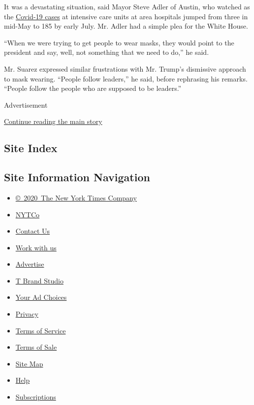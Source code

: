 It was a devastating situation, said Mayor Steve Adler of Austin, who
watched as the
\href{https://dshs.texas.gov/coronavirus/additionaldata.aspx}{Covid-19
cases} at intensive care units at area hospitals jumped from three in
mid-May to 185 by early July. Mr. Adler had a simple plea for the White
House.

``When we were trying to get people to wear masks, they would point to
the president and say, well, not something that we need to do,'' he
said.

Mr. Suarez expressed similar frustrations with Mr. Trump's dismissive
approach to mask wearing. ``People follow leaders,'' he said, before
rephrasing his remarks. ``People follow the people who are supposed to
be leaders.''

Advertisement

\protect\hyperlink{after-bottom}{Continue reading the main story}

\hypertarget{site-index}{%
\subsection{Site Index}\label{site-index}}

\hypertarget{site-information-navigation}{%
\subsection{Site Information
Navigation}\label{site-information-navigation}}

\begin{itemize}
\tightlist
\item
  \href{https://help.nytimes.com/hc/en-us/articles/115014792127-Copyright-notice}{©~2020~The
  New York Times Company}
\end{itemize}

\begin{itemize}
\tightlist
\item
  \href{https://www.nytco.com/}{NYTCo}
\item
  \href{https://help.nytimes.com/hc/en-us/articles/115015385887-Contact-Us}{Contact
  Us}
\item
  \href{https://www.nytco.com/careers/}{Work with us}
\item
  \href{https://nytmediakit.com/}{Advertise}
\item
  \href{http://www.tbrandstudio.com/}{T Brand Studio}
\item
  \href{https://www.nytimes.com/privacy/cookie-policy\#how-do-i-manage-trackers}{Your
  Ad Choices}
\item
  \href{https://www.nytimes.com/privacy}{Privacy}
\item
  \href{https://help.nytimes.com/hc/en-us/articles/115014893428-Terms-of-service}{Terms
  of Service}
\item
  \href{https://help.nytimes.com/hc/en-us/articles/115014893968-Terms-of-sale}{Terms
  of Sale}
\item
  \href{https://spiderbites.nytimes.com}{Site Map}
\item
  \href{https://help.nytimes.com/hc/en-us}{Help}
\item
  \href{https://www.nytimes.com/subscription?campaignId=37WXW}{Subscriptions}
\end{itemize}
